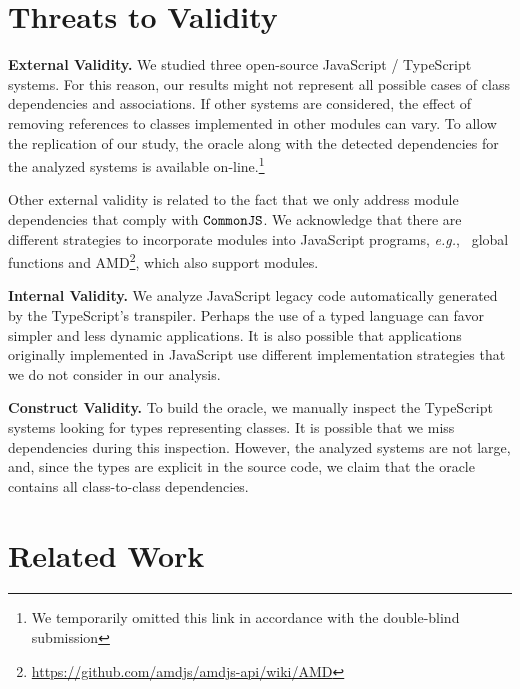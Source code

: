 \documentclass[review]{elsarticle}
\newcommand{\mcode}[1]{$\tt #1$}
\begin{document}
\section{Threats to Validity}
\label{sec:threats}

\noindent \textbf{External Validity.} We studied three open-source JavaScript / TypeScript systems. For this reason, our results might not represent all possible cases of class dependencies and associations. If other systems are considered, the effect of removing references to classes implemented in other modules can vary. To allow the replication of our study, the oracle along with the detected dependencies for the analyzed systems is available on-line.\footnote{We temporarily omitted this link in accordance with the double-blind submission}

Other external validity is related to the fact that we only address module dependencies that comply with \mcode{CommonJS}. We acknowledge that there are different strategies to incorporate modules into JavaScript programs, \emph{e.g.},~ global functions and AMD\footnote{\url{https://github.com/amdjs/amdjs-api/wiki/AMD}}, which also support modules.

\vspace{1.5 mm}

\noindent \textbf{Internal Validity.} We analyze JavaScript legacy code automatically generated by the TypeScript's transpiler. Perhaps the use of a typed language can favor simpler and less dynamic applications. It is also possible that applications originally implemented in JavaScript use different implementation strategies that we do not consider in our analysis. 

\vspace{1.5 mm}

\noindent \textbf{Construct Validity.} To build the oracle, we manually inspect the TypeScript systems looking for types representing classes. It is possible that we miss dependencies during this inspection. However, the analyzed systems are not large, and, since the types are explicit in the source code, we claim that the oracle contains all class-to-class dependencies.  



\section{Related Work}
\label{sec:related-work}
\end{document}
